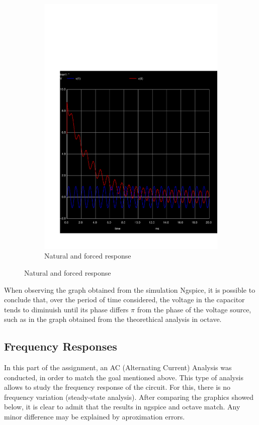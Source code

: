 \begin{figure}[h]
\begin{subfigure}{0.42\textwidth}
\includegraphics[width=\textwidth]{sim4.pdf}
\caption{Natural and forced response}
\label{fig:second}
\end{subfigure}
\end{figure}

When observing the graph obtained from the simulation  Ngspice, it is possible to conclude that, over the period of time considered, the voltage in the capacitor tends
to diminuish until its phase differs $\pi$ from the phase of the voltage source, such as in the graph obtained from the theorethical analysis in octave.

\subsection{Frequency Responses}

In this part of the assignment, an AC (Alternating Current) Analysis was conducted, in order to match the goal mentioned above. This type of analysis allows to study the frequency response of the circuit. For this, there is no frequency variation (steady-state analysis). After comparing the graphics showed below, it is clear to admit that the results in ngspice and octave match. Any minor difference may be explained by aproximation errors.

